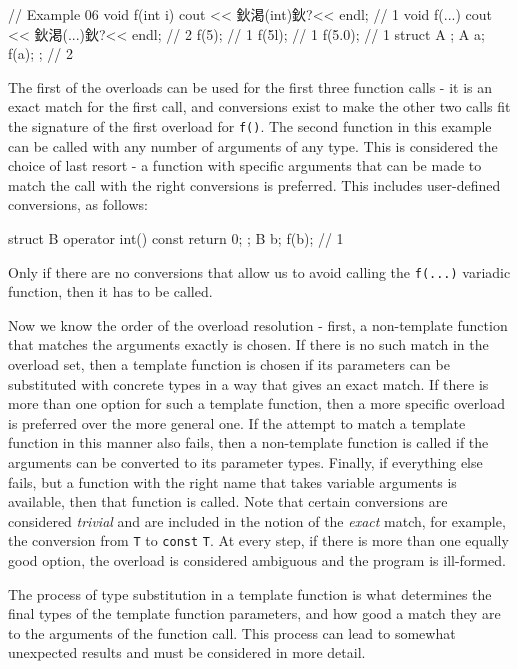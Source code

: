 \begin{code}
// Example 06
void f(int i) { cout << 鈥渇(int)鈥?<< endl; }    // 1
void f(...) { cout << 鈥渇(...)鈥?<< endl; }    // 2
f(5);        // 1
f(5l);    // 1
f(5.0);    // 1
struct A {};
A a;
f(a);    {};    // 2
\end{code}

The first of the overloads can be used for the first three function calls - it is an exact match for the first call, and conversions exist to make the other two calls fit the signature of the first overload for \texttt{f()}. The second function in this example can be called with any number of arguments of any type. This is considered the choice of last resort - a function with specific arguments that can be made to match the call with the right conversions is preferred. This includes user-defined conversions, as follows:

\begin{code}
struct B {
  operator int() const { return 0; }
};
B b;
f(b);        // 1
\end{code}

Only if there are no conversions that allow us to avoid calling the \texttt{f(...)} variadic function, then it has to be called.

Now we know the order of the overload resolution - first, a non-template function that matches the arguments exactly is chosen. If there is no such match in the overload set, then a template function is chosen if its parameters can be substituted with concrete types in a way that gives an exact match. If there is more than one option for such a template function, then a more specific overload is preferred over the more general one. If the attempt to match a template function in this manner also fails, then a non-template function is called if the arguments can be converted to its parameter types. Finally, if everything else fails, but a function with the right name that takes variable arguments is available, then that function is called. Note that certain conversions are considered \emph{trivial} and are included in the notion of the \emph{exact} match, for example, the conversion from \texttt{T} to \texttt{const} \texttt{T}. At every step, if there is more than one equally good option, the overload is considered ambiguous and the program is ill-formed.

The process of type substitution in a template function is what determines the final types of the template function parameters, and how good a match they are to the arguments of the function call. This process can lead to somewhat unexpected results and must be considered in more detail.

